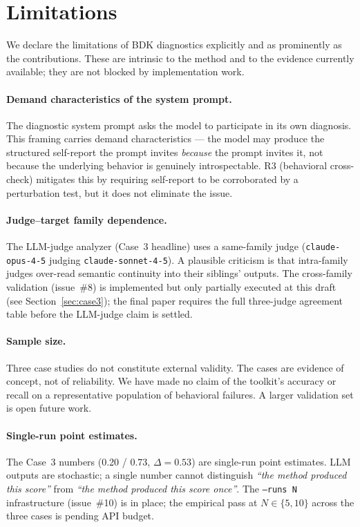 \section{Limitations}
\label{sec:limitations}

We declare the limitations of BDK diagnostics explicitly and as
prominently as the contributions. These are intrinsic to the method
and to the evidence currently available; they are not blocked by
implementation work.

\paragraph{Demand characteristics of the system prompt.}
The diagnostic system prompt asks the model to participate in its own
diagnosis. This framing carries demand characteristics --- the model
may produce the structured self-report the prompt invites \emph{because}
the prompt invites it, not because the underlying behavior is genuinely
introspectable. R3 (behavioral cross-check) mitigates this by requiring
self-report to be corroborated by a perturbation test, but it does not
eliminate the issue.

\paragraph{Judge--target family dependence.}
The LLM-judge analyzer (Case~3 headline) uses a same-family judge
(\texttt{claude-opus-4-5} judging \texttt{claude-sonnet-4-5}). A
plausible criticism is that intra-family judges over-read semantic
continuity into their siblings' outputs. The cross-family validation
(issue~\#8) is implemented but only partially executed at this draft
(see Section~\ref{sec:case3}); the final paper requires the full
three-judge agreement table before the LLM-judge claim is settled.

\paragraph{Sample size.}
Three case studies do not constitute external validity. The cases are
evidence of concept, not of reliability. We have made no claim of the
toolkit's accuracy or recall on a representative population of
behavioral failures. A larger validation set is open future work.

\paragraph{Single-run point estimates.}
The Case~3 numbers (0.20 / 0.73, $\Delta = 0.53$) are single-run point
estimates. LLM outputs are stochastic; a single number cannot
distinguish \emph{``the method produced this score''} from
\emph{``the method produced this score once''}. The
\texttt{--runs N} infrastructure (issue~\#10) is in place; the
empirical pass at $N \in \{5, 10\}$ across the three cases is pending
API budget.

